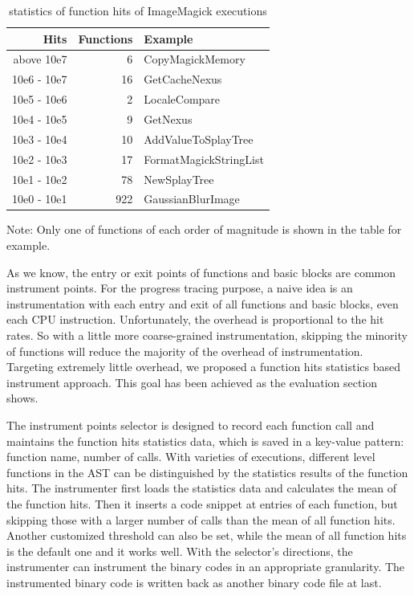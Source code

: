 \begin{table}[h]
\caption{statistics of function hits of ImageMagick executions}
\label{table:inst-stats}
\begin{center}
\begin{tabular}{r|r|l}
\hline
Hits & Functions & Example \\
\hline
above  10e7 & 6 & CopyMagickMemory \\
10e6 - 10e7 & 16 & GetCacheNexus \\
10e5 - 10e6 & 2 & LocaleCompare \\
10e4 - 10e5 & 9 & GetNexus \\
10e3 - 10e4 & 10 & AddValueToSplayTree \\
10e2 - 10e3 & 17 & FormatMagickStringList \\
10e1 - 10e2 & 78 & NewSplayTree \\
10e0 - 10e1 & 922 & GaussianBlurImage \\
\hline
\end{tabular}
\end{center}
Note: Only one of functions of each order of magnitude is shown in the table for example.
\end{table}

As we know, the entry or exit points of functions and basic blocks are common instrument points. For the progress tracing purpose, a naive idea is an instrumentation with each entry and exit of all functions and basic blocks, even each CPU instruction. Unfortunately, the overhead is proportional to the hit rates. So with a little more coarse-grained instrumentation, skipping the minority of functions will reduce the majority of the overhead of instrumentation. Targeting extremely little overhead, we proposed a function hits statistics based instrument approach. This goal has been achieved as the evaluation section shows.

The instrument points selector is designed to record each function call and maintains the function hits statistics data, which is saved in a key-value pattern: function name, number of calls. With varieties of executions, different level functions in the AST can be distinguished by the statistics results of the function hits. The instrumenter first loads the statistics data and calculates the mean of the function hits. Then it inserts a code snippet at entries of each function, but skipping those with a larger number of calls than the mean of all function hits. Another customized threshold can also be set, while the mean of all function hits is the default one and it works well. With the selector's directions, the instrumenter can instrument the binary codes in an appropriate granularity. The instrumented binary code is written back as another binary code file at last.

